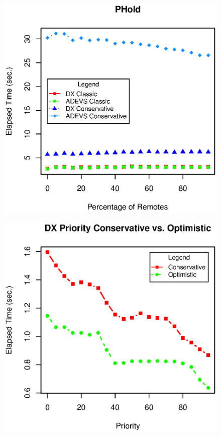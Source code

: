 \documentclass{scs}
\begin{document}
\begin{figure}[h]
	\includegraphics[width=.5\textwidth]{fig5.eps}
	\label{fig5.eps}
\end{figure}

\begin{figure}[h]
	\includegraphics[width=.5\textwidth]{fig6.eps}
	\label{fig6.eps}
\end{figure}
\end{document}

